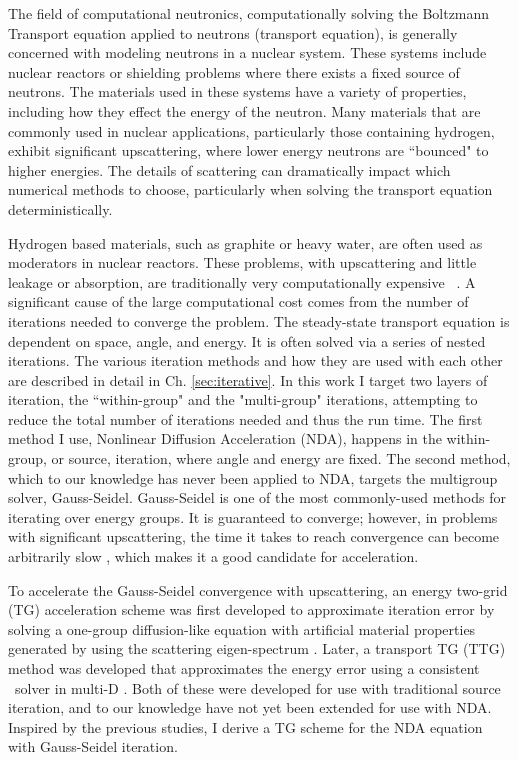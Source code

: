 The field of computational neutronics, computationally solving the Boltzmann Transport equation applied to neutrons (transport equation), is generally concerned with modeling neutrons in a nuclear system. These systems include nuclear reactors or shielding problems where there exists a fixed source of neutrons. The materials used in these systems have a variety of properties, including how they effect the energy of the neutron. Many materials that are commonly used in nuclear applications, particularly those containing hydrogen, exhibit significant upscattering, where lower energy neutrons are ``bounced" to higher energies. The details of scattering can dramatically impact which numerical methods to choose, particularly when solving the transport equation deterministically. 

Hydrogen based materials, such as graphite or heavy water, are often used as moderators in nuclear reactors. These problems, with upscattering and little leakage or absorption, are traditionally very computationally expensive ~\cite{morel-upscat}. A significant cause of the large computational cost comes from the number of iterations needed to converge the problem. The steady-state transport equation is dependent on space, angle, and energy. It is often solved via a series of nested iterations. The various iteration methods and how they are used with each other are described in detail in Ch. \ref{sec:iterative}. In this work I target two layers of iteration, the ``within-group" and the "multi-group" iterations, attempting to reduce the total number of iterations needed and thus the run time. The first method I use, Nonlinear Diffusion Acceleration (NDA), happens in the within-group, or source, iteration, where angle and energy are fixed. The second method, which to our knowledge has never been applied to NDA, targets the multigroup solver, Gauss-Seidel. Gauss-Seidel is one of the most commonly-used methods for iterating over energy groups. It is guaranteed to converge; however, in problems with significant upscattering, the time it takes to reach convergence can become arbitrarily slow \cite{evans-upscat}, which makes it a good candidate for acceleration. 

To accelerate the Gauss-Seidel convergence with upscattering, an energy two-grid (TG) acceleration scheme was first developed to approximate iteration error by solving a one-group diffusion-like equation with artificial material properties generated by using the scattering eigen-spectrum \cite{morel-upscat}. Later, a transport TG (TTG) method was developed that approximates the energy error using a consistent \sn\ solver in multi-D \cite{evans-upscat}. Both of these were developed for use with traditional source iteration, and to our knowledge have not yet been extended for use with NDA. Inspired by the previous studies, I derive a TG scheme for the NDA equation with Gauss-Seidel iteration.



